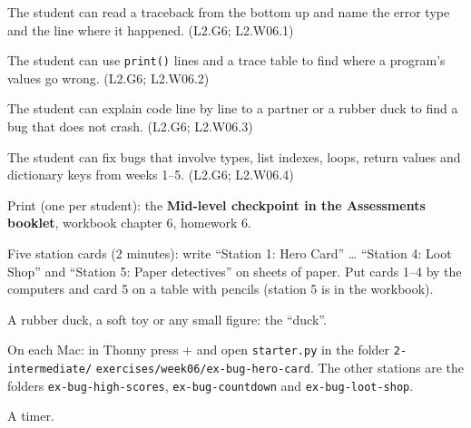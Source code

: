 
\begin{objectives}
  \item The student can read a traceback from the bottom up and name the error type and the line where it happened. (L2.G6; L2.W06.1)
  \item The student can use \texttt{print()} lines and a trace table to find where a program's values go wrong. (L2.G6; L2.W06.2)
  \item The student can explain code line by line to a partner or a rubber duck to find a bug that does not crash. (L2.G6; L2.W06.3)
  \item The student can fix bugs that involve types, list indexes, loops, return values and dictionary keys from weeks 1--5. (L2.G6; L2.W06.4)
\end{objectives}

\begin{materials}
  \item Print (one per student): the \textbf{Mid-level checkpoint in the Assessments booklet}, workbook chapter 6, homework 6.
  \item Five station cards (2 minutes): write \enquote{Station 1: Hero Card} \ldots{} \enquote{Station 4: Loot Shop} and \enquote{Station 5: Paper detectives}
        on sheets of paper. Put cards 1--4 by the computers and card 5 on a table with pencils (station 5 is in the workbook).
  \item A rubber duck, a soft toy or any small figure: the \enquote{duck}.
  \item On each Mac: in Thonny press + and open \texttt{starter.py} in the folder \texttt{2-intermediate/} \texttt{exercises/week06/ex-bug-hero-card}.
        The other stations are the folders \texttt{ex-bug-high-scores}, \texttt{ex-bug-countdown} and \texttt{ex-bug-loot-shop}.
  \item A timer.
\end{materials}

